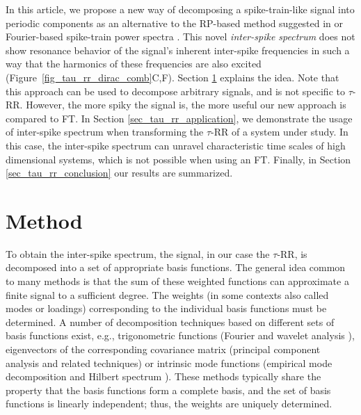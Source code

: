 \documentclass[entropy,article,accept,pdftex,moreauthors]{Definitions/mdpi}
\begin{document}
In this article, we propose a new way of decomposing a spike-train-like signal into periodic components as 
an alternative to the RP-based method suggested in \cite{Zbilut2008} or Fourier-based spike-train power 
spectra \cite{Dummer2014}. This novel \textit{inter-spike spectrum} does not show resonance 
behavior of the signal's inherent inter-spike frequencies in such a way that the harmonics of these frequencies are also excited (Figure~\ref{fig_tau_rr_dirac_comb}C,F). Section \ref{sec_tau_rr_method} explains the idea. Note that this approach can be used to decompose arbitrary signals, and is not specific to $\tau$-RR. However, the more spiky the signal is, the more useful our new approach is compared to 
FT. In Section \ref{sec_tau_rr_application}, we demonstrate the usage of inter-spike spectrum when transforming the $\tau$-RR of a system under study. In this case, the inter-spike spectrum 
can unravel characteristic time scales of high dimensional systems, which is not possible when using an FT. Finally, in Section \ref{sec_tau_rr_conclusion} our results are summarized.


\section{Method}\label{sec_tau_rr_method}
    

To obtain the inter-spike spectrum, the signal, in our case the $\tau$-RR, is decomposed into a set of appropriate basis functions. 
The general idea common to many methods is that the sum of these weighted functions can approximate a finite signal to a sufficient degree. The weights (in some contexts also called modes or loadings) corresponding to the individual basis functions must be determined.
A number of decomposition techniques based on different sets of basis functions exist, e.g., 
trigonometric functions (Fourier and wavelet analysis \cite{Bracewell1986}), 
eigenvectors of the corresponding covariance matrix (principal component analysis \cite{Hotelling1933} and related techniques) 
or intrinsic mode functions (empirical mode decomposition and Hilbert spectrum \cite{Norden1998}).
These methods typically share the property that the basis functions form a complete basis, and
the set of basis functions is linearly independent; thus, the weights are uniquely determined.
\end{document}
